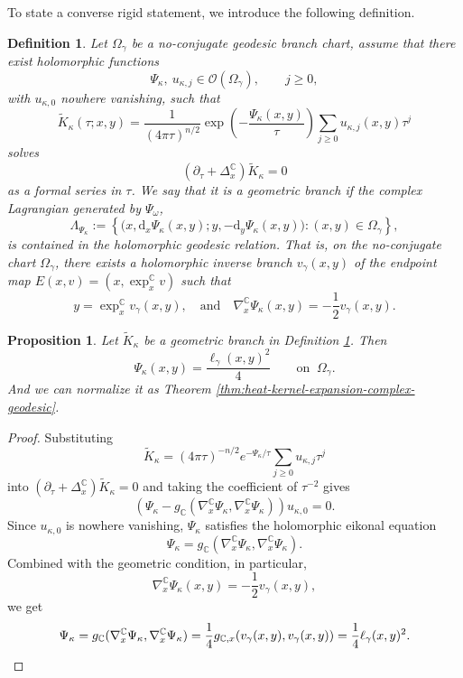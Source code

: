 \documentclass[11pt]{amsart}
\theoremstyle{plain}
\newtheorem{prop}[thm]{Proposition}
\newtheorem{defn}[thm]{Definition}
\theoremstyle{definition}
\newcommand{\C}{\mathbb{C}}
\newcommand{\dd}{\mathrm d}
\begin{document}
To state a converse rigid statement, we introduce the following definition.
\begin{defn}\label{def:geometric-WKB}
Let $\Omega_{\gamma}$ be a no-conjugate geodesic branch chart, assume that there exist holomorphic functions
\[
\Psi_\kappa,\ u_{\kappa,j}\in \mathcal O(\Omega_{\gamma}),
\qquad j\geq 0,
\]
with $u_{\kappa,0}$ nowhere vanishing, such that
\[
\widetilde K_\kappa(\tau;x,y)=\frac{1}{(4\pi\tau)^{n/2}}
\exp\left(-\frac{\Psi_\kappa(x,y)}{\tau}\right)
\sum_{j\geq 0}u_{\kappa,j}(x,y)\tau^j
\]
solves
\[
\left(\partial_\tau+\Delta_x^{\mathbb C}\right)\widetilde K_\kappa=0
\]
as a formal series in $\tau$. We say that it is a geometric branch if the complex Lagrangian generated by
$\Psi_\omega$,
\[
\Lambda_{\Psi_\kappa}:=\left\{\bigl(x,\dd_x\Psi_\kappa(x,y);y,-\dd_y\Psi_\kappa(x,y)\bigr)
:(x,y)\in\Omega_{\gamma}\right\},
\]
is contained in the holomorphic geodesic relation. That is, on the no-conjugate chart $\Omega_\gamma$, there exists a holomorphic inverse branch $v_\gamma(x,y)$ of the endpoint map $E(x,v)=(x,\exp_x^{\mathbb C}v)$ such that
\[
y=\exp_x^{\mathbb C}v_\gamma(x,y),\quad\text{and}\quad
\nabla_x^{\mathbb C}\Psi_\kappa(x,y)=-\frac12 v_\gamma(x,y).
\]
\end{defn}


\begin{prop}\label{prop:phase-rigidity-geodesic-branch}
Let $\widetilde{K}_{\kappa}$ be a geometric branch in Definition \ref{def:geometric-WKB}. Then
\[
\Psi_\kappa(x,y)=\frac{\ell_\gamma(x,y)^2}{4}\qquad
\text{on }~ \Omega_\gamma.
\]
And we can normalize it as Theorem \ref{thm:heat-kernel-expansion-complex-geodesic}.
\end{prop}

\begin{proof}
Substituting
\[
\widetilde K_\kappa=(4\pi\tau)^{-n/2}e^{-\Psi_\kappa/\tau}
\sum_{j\geq 0}u_{\kappa,j}\tau^j
\]
into $(\partial_\tau+\Delta_x^{\mathbb C})\widetilde K_\kappa=0$ and
taking the coefficient of $\tau^{-2}$ gives
\[
\left(\Psi_\kappa-g_{\mathbb C}(\nabla_x^{\C}\Psi_\kappa,\nabla_x^{\C}\Psi_\kappa)\right)u_{\kappa,0}=0.
\]
Since $u_{\kappa,0}$ is nowhere vanishing, $\Psi_\kappa$ satisfies the holomorphic eikonal equation
\[
\Psi_\kappa=g_{\mathbb C}(\nabla_x^{\C}\Psi_\kappa,\nabla_x^{\C}\Psi_\kappa).
\]
Combined with the geometric condition, in particular,
\[\nabla_x^{\mathbb C}\Psi_\kappa(x,y)=-\frac12 v_\gamma(x,y),\]
we get
\[
\Psi_{\kappa}=g_{\mathbb C}(\nabla_x^{\C}\Psi_\kappa,\nabla_x^{\C}\Psi_\kappa)=\frac14 g_{\mathbb C,x}(v_\gamma(x,y),v_\gamma(x,y))
=\frac{1}{4}\ell_{\gamma}(x,y)^2.\qedhere\]
\end{proof}
\end{document}
